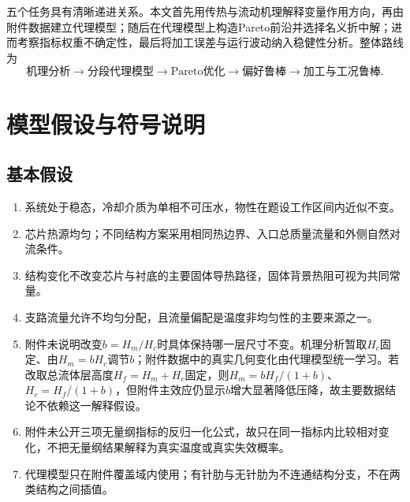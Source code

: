 \documentclass[UTF8,12pt,a4paper]{ctexart}
\begin{document}
五个任务具有清晰递进关系。本文首先用传热与流动机理解释变量作用方向，再由附件数据建立代理模型；随后在代理模型上构造Pareto前沿并选择名义折中解；进而考察指标权重不确定性，最后将加工误差与运行波动纳入稳健性分析。整体路线为
\[
\text{机理分析}\longrightarrow\text{分段代理模型}\longrightarrow\text{Pareto优化}
\longrightarrow\text{偏好鲁棒}\longrightarrow\text{加工与工况鲁棒}.
\]

\section{模型假设与符号说明}

\subsection{基本假设}
\begin{enumerate}
  \item 系统处于稳态，冷却介质为单相不可压水，物性在题设工作区间内近似不变。
  \item 芯片热源均匀；不同结构方案采用相同热边界、入口总质量流量和外侧自然对流条件。
  \item 结构变化不改变芯片与衬底的主要固体导热路径，固体背景热阻可视为共同常量。
  \item 支路流量允许不均匀分配，且流量偏配是温度非均匀性的主要来源之一。
  \item 附件未说明改变$b=H_m/H_c$时具体保持哪一层尺寸不变。机理分析暂取$H_c$固定、由$H_m=bH_c$调节$b$；附件数据中的真实几何变化由代理模型统一学习。若改取总流体层高度$H_f=H_m+H_c$固定，则$H_m=bH_f/(1+b)$、$H_c=H_f/(1+b)$，但附件主效应仍显示$b$增大显著降低压降，故主要数据结论不依赖这一解释假设。
  \item 附件未公开三项无量纲指标的反归一化公式，故只在同一指标内比较相对变化，不把无量纲结果解释为真实温度或真实失效概率。
  \item 代理模型只在附件覆盖域内使用；有针肋与无针肋为不连通结构分支，不在两类结构之间插值。
\end{enumerate}
\end{document}

